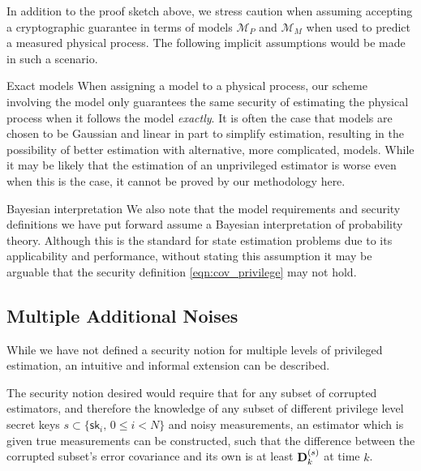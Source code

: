 \documentclass[letterpaper, 10 pt, conference]{IEEEtran}
\theoremstyle{definition}
\theoremstyle{definition}
\theoremstyle{remark}
\begin{document}
In addition to the proof sketch above, we stress caution when assuming accepting a cryptographic guarantee in terms of models $\mathcal{M}_P$ and $\mathcal{M}_M$ when used to predict a measured physical process. The following implicit assumptions would be made in such a scenario.
\begin{LaTeXdescription}
   \item[Exact models] When assigning a model to a physical process, our scheme involving the model only guarantees the same security of estimating the physical process when it follows the model \textit{exactly}. It is often the case that models are chosen to be Gaussian and linear in part to simplify estimation, resulting in the possibility of better estimation with alternative, more complicated, models. While it may be likely that the estimation of an unprivileged estimator is worse even when this is the case, it cannot be proved by our methodology here.
   \item[Bayesian interpretation] We also note that the model requirements and security definitions we have put forward assume a Bayesian interpretation of probability theory. Although this is the standard for state estimation problems due to its applicability and performance, without stating this assumption it may be arguable that the security definition \ref{eqn:cov_privilege} may not hold.
\end{LaTeXdescription}

% 
% 

\subsection{Multiple Additional Noises}
While we have not defined a security notion for multiple levels of privileged estimation, an intuitive and informal extension can be described.

The security notion desired would require that for any subset of corrupted estimators, and therefore the knowledge of any subset of different privilege level secret keys $s \subset \{\mathsf{sk}_i,\,0 \leq i < N\}$ and noisy measurements, an estimator which is given true measurements can be constructed, such that the difference between the corrupted subset's error covariance and its own is at least ${{\mathbf{D}}}^{(s)}_k$ at time $k$.
\end{document}
